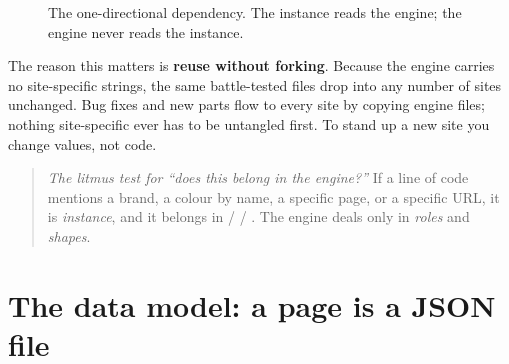 \documentclass[11pt]{article}
\begin{document}
\begin{figure}[h]
\centering
{}
\caption{The one-directional dependency. The instance reads the engine; the
engine never reads the instance.}
\label{fig:split}
\end{figure}

The reason this matters is \textbf{reuse without forking}. Because the engine
carries no site-specific strings, the same battle-tested files drop into any
number of sites unchanged. Bug fixes and new parts flow to every site by copying
engine files; nothing site-specific ever has to be untangled first. To stand up a
new site you change values, not code.

\begin{quote}
\small\emph{The litmus test for ``does this belong in the engine?''} If a line of
code mentions a brand, a colour by name, a specific page, or a specific URL, it
is \emph{instance}, and it belongs in  /
 / . The engine deals only in \emph{roles} and
\emph{shapes}.
\end{quote}

\section{The data model: a page is a JSON file}
\end{document}
